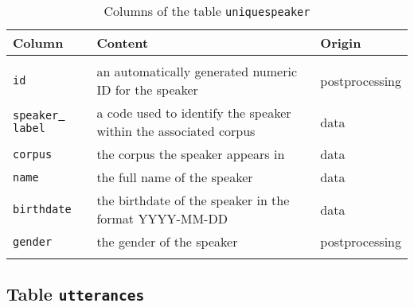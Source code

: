 \documentclass[a4paper, 11pt]{book}
\newcommand{\und}{\underline{{ }}\hspace{0.2mm}}	%
\begin{document}
\begin{longtable}{lp{.5\linewidth}p{.2\linewidth}}
	\toprule
		\textbf{Column} & \textbf{Content} 	& \textbf{Origin} \\
	\midrule
	\endhead
	
	\bottomrule\\[-0.15cm]
	\caption{Columns of the table \texttt{uniquespeaker}}
	\endfoot
	
		\texttt{id} 		& an automatically generated numeric ID for the speaker & postprocessing \\
		\texttt{speaker\und label} & a code used to identify the speaker within the associated corpus & data \\
		\texttt{corpus} 	& the corpus the speaker appears in & data \\ 
		\texttt{name}		& the full name of the speaker & data \\
		\texttt{birthdate} 	& the birthdate of the speaker in the format YYYY-MM-DD & data \\ 
		\texttt{gender} 	& the gender of the speaker & postprocessing \\[-0.3cm]
	\label{tab:Table uniquespeakers}
\end{longtable}


\subsection{Table \texttt{utterances}}
\label{subsec:Table utterances}
\end{document}
